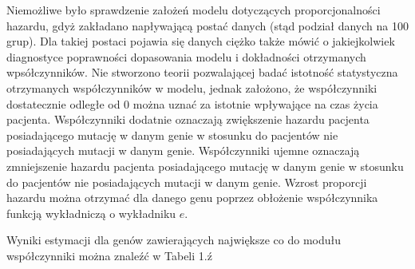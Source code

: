 \documentclass[]{article}
\begin{document}
Niemożliwe było sprawdzenie założeń modelu dotyczących proporcjonalności
hazardu, gdyż zakładano napływającą postać danych (stąd podział danych
na 100 grup). Dla takiej postaci pojawia się danych ciężko także mówić o
jakiejkolwiek diagnostyce poprawności dopasowania modelu i dokładności
otrzymanych wpsółczynników. Nie stworzono teorii pozwalającej badać
istotność statystyczna otrzymanych współczynników w modelu, jednak
założono, że współczynniki dostatecznie odległe od \(0\) można uznać za
istotnie wpływające na czas życia pacjenta. Współczynniki dodatnie
oznaczają zwiększenie hazardu pacjenta posiadającego mutację w danym
genie w stosunku do pacjentów nie posiadających mutacji w danym genie.
Współczynniki ujemne oznaczają zmniejszenie hazardu pacjenta
posiadającego mutację w danym genie w stosunku do pacjentów nie
posiadających mutacji w danym genie. Wzrost proporcji hazardu można
otrzymać dla danego genu poprzez obłożenie współczynnika funkcją
wykładniczą o wykładniku \(e\).

Wyniki estymacji dla genów zawierających największe co do modułu
współczynniki można znaleźć w Tabeli 1.ź
\end{document}
